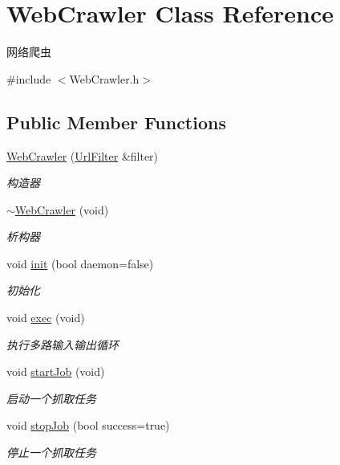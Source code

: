 \hypertarget{class_web_crawler}{}\section{Web\+Crawler Class Reference}
\label{class_web_crawler}


网络爬虫  




{\ttfamily \#include $<$Web\+Crawler.\+h$>$}

\subsection*{Public Member Functions}
\begin{DoxyCompactItemize}
\item 
\hyperlink{class_web_crawler_ad8120b764c991bbf51764d47ea097b88}{Web\+Crawler} (\hyperlink{class_url_filter}{Url\+Filter} \&filter)
\begin{DoxyCompactList}\small\item\em 构造器 \end{DoxyCompactList}\item 
\mbox{\label{class_web_crawler_a4f135eede21f8a08df3b4b86e7928f7b}} 
\hyperlink{class_web_crawler_a4f135eede21f8a08df3b4b86e7928f7b}{$\sim$\+Web\+Crawler} (void)
\begin{DoxyCompactList}\small\item\em 析构器 \end{DoxyCompactList}\item 
void \hyperlink{class_web_crawler_aa33817c1f415d3be793e7b43198d253e}{init} (bool daemon=false)
\begin{DoxyCompactList}\small\item\em 初始化 \end{DoxyCompactList}\item 
\mbox{\label{class_web_crawler_a940428b71b32361953b241079c62b24d}} 
void \hyperlink{class_web_crawler_a940428b71b32361953b241079c62b24d}{exec} (void)
\begin{DoxyCompactList}\small\item\em 执行多路输入输出循环 \end{DoxyCompactList}\item 
\mbox{\label{class_web_crawler_a6d21283f301038ee6aa5bc1bb57d1d7c}} 
void \hyperlink{class_web_crawler_a6d21283f301038ee6aa5bc1bb57d1d7c}{start\+Job} (void)
\begin{DoxyCompactList}\small\item\em 启动一个抓取任务 \end{DoxyCompactList}\item 
void \hyperlink{class_web_crawler_a7da15941a0fd20e1ae53d4077d61c9d4}{stop\+Job} (bool success=true)
\begin{DoxyCompactList}\small\item\em 停止一个抓取任务 \end{DoxyCompactList}\end{DoxyCompactItemize}
